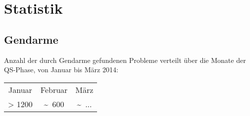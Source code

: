 %



\newpage



\section{Statistik}
\label{Abschnitt:Programmfehler:Statistik}





\subsection*{Gendarme}


Anzahl der durch Gendarme gefundenen Probleme verteilt über die Monate der QS-Phase, von Januar bis März 2014:\\

\begin{longtable}{ccc}

	  Januar
	& Februar
	& März
	
	\\
	
      > 1200
	& \textasciitilde~600
	& \textasciitilde~...

\end{longtable}




